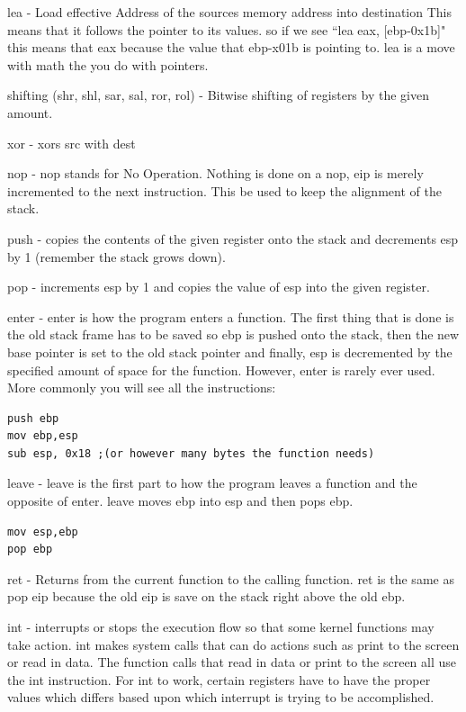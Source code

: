 \documentclass{report}
\begin{document}
lea - Load effective Address of the sources memory address into destination This means that it follows the pointer to its values. so if we see ``lea eax, [ebp-0x1b]" this means that eax because the value that ebp-x01b is pointing to. lea is a move with math the you do with pointers.\newline

shifting (shr, shl, sar, sal, ror, rol) - Bitwise shifting of registers by the given amount.\newline

xor - xors src with dest\newline

nop - nop stands for No Operation. Nothing is done on a nop, eip is merely incremented to the next instruction.  This be used to keep the alignment of the stack.\newline

push - copies the contents of the given register onto the stack and decrements esp by 1 (remember the stack grows down).\newline

pop - increments esp by 1 and copies the value of esp into the given register.\newline

enter - enter is how the program enters a function.  The first thing that is done is the old stack frame has to be saved so ebp is pushed onto the stack, then the new base pointer is set to the old stack pointer and finally, esp is decremented by the specified amount of space for the function.  However, enter is rarely ever used.  More commonly you will see all the instructions: 
\begin{lstlisting}
push ebp
mov ebp,esp
sub esp, 0x18 ;(or however many bytes the function needs)
\end{lstlisting}

leave - leave is the first part to how the program leaves a function and the opposite of enter.  leave moves ebp into esp and then pops ebp.
\begin{lstlisting}
mov esp,ebp
pop ebp
\end{lstlisting}

ret - Returns from the current function to the calling function.  ret is the same as pop eip because the old eip is save on the stack right above the old ebp.\newline

int - interrupts or stops the execution flow so that some kernel functions may take action.  int makes system calls that can do actions such as print to the screen or read in data.  The function calls that read in data or print to the screen all use the int instruction.  For int to work, certain registers have to have the proper values which differs based upon which interrupt is trying to be accomplished.\newline
\end{document}
